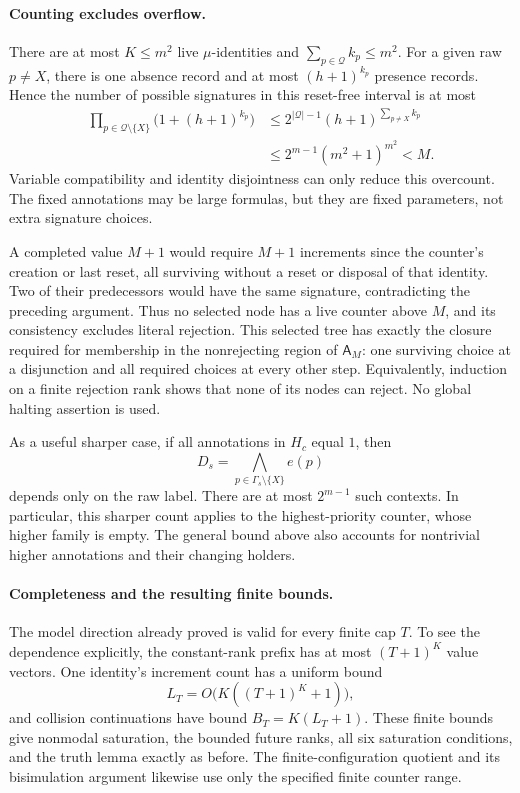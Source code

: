 \paragraph{Counting excludes overflow.}
There are at most \(K\leq m^2\)
live \(\mu\)-identities and
\(\sum_{p\in\mathcal Q}k_p\leq m^2\).
For a given raw \(p\ne X\),
there is one absence record and
at most \((h+1)^{k_p}\) presence
records. Hence the number of
possible signatures in this
reset-free interval is at most
\[
\begin{aligned}
 \prod_{p\in\mathcal Q\setminus\{X\}}
               \bigl(1+(h+1)^{k_p}\bigr)
 &\leq 2^{|\mathcal Q|-1}
                    (h+1)^{\sum_{p\ne X}k_p}\\
 &\leq 2^{m-1}(m^2+1)^{m^2}<M.
\end{aligned}
\]
Variable compatibility and identity
disjointness can only reduce this
overcount. The fixed annotations
may be large formulas, but they
are fixed parameters, not extra
signature choices.

A completed value \(M+1\) would
require \(M+1\) increments since
the counter's creation or last
reset, all surviving without a
reset or disposal of that identity.
Two of their predecessors would
have the same signature, contradicting
the preceding argument.
Thus no selected node has a live
counter above \(M\), and its
consistency excludes literal rejection.
This selected tree has exactly
the closure required for membership
in the nonrejecting region of
\(\mathsf A_M\): one surviving
choice at a disjunction and all
required choices at every other
step. Equivalently, induction on
a finite rejection rank shows
that none of its nodes can reject.
No global halting assertion is used.

As a useful sharper case, if all
annotations in \(H_c\) equal \(1\),
then
\[
 D_s=\bigwedge_{p\in\Gamma_s\setminus\{X\}}e(p)
\]
depends only on the raw label.
There are at most \(2^{m-1}\)
such contexts. In particular,
this sharper count applies to
the highest-priority counter,
whose higher family is empty.
The general bound above also
accounts for nontrivial higher
annotations and their changing holders.

\paragraph{Completeness and the resulting finite bounds.}
The model direction already proved
is valid for every finite cap \(T\).
To see the dependence explicitly,
the constant-rank prefix has at
most \((T+1)^K\) value vectors.
One identity's increment count
has a uniform bound
\[
 L_T=O\bigl(K((T+1)^K+1)\bigr),
\]
and collision continuations have
bound \(B_T=K(L_T+1)\).
These finite bounds give nonmodal
saturation, the bounded future
ranks, all six saturation conditions,
and the truth lemma exactly as
before. The finite-configuration
quotient and its bisimulation
argument likewise use only the
specified finite counter range.

